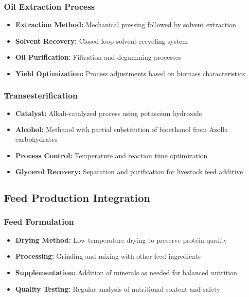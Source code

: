 \subsubsection{Oil Extraction Process}
\begin{itemize}
    \item \textbf{Extraction Method:} Mechanical pressing followed by solvent extraction
    \item \textbf{Solvent Recovery:} Closed-loop solvent recycling system
    \item \textbf{Oil Purification:} Filtration and degumming processes
    \item \textbf{Yield Optimization:} Process adjustments based on biomass characteristics
\end{itemize}

\subsubsection{Transesterification}
\begin{itemize}
    \item \textbf{Catalyst:} Alkali-catalyzed process using potassium hydroxide
    \item \textbf{Alcohol:} Methanol with partial substitution of bioethanol from Azolla carbohydrates
    \item \textbf{Process Control:} Temperature and reaction time optimization
    \item \textbf{Glycerol Recovery:} Separation and purification for livestock feed additive
\end{itemize}

\subsection{Feed Production Integration}

\subsubsection{Feed Formulation}
\begin{itemize}
    \item \textbf{Drying Method:} Low-temperature drying to preserve protein quality
    \item \textbf{Processing:} Grinding and mixing with other feed ingredients
    \item \textbf{Supplementation:} Addition of minerals as needed for balanced nutrition
    \item \textbf{Quality Testing:} Regular analysis of nutritional content and safety
\end{itemize}

